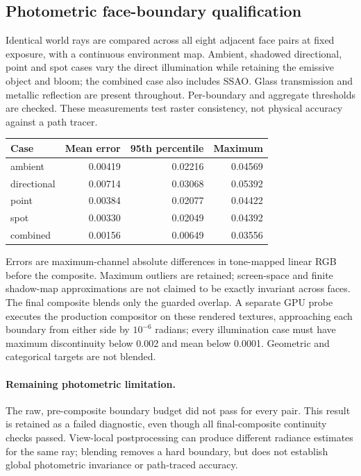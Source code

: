 \subsection{Photometric face-boundary qualification}
Identical world rays are compared across all eight adjacent face pairs at fixed exposure, with a continuous environment map. Ambient, shadowed directional, point and spot cases vary the direct illumination while retaining the emissive object and bloom; the combined case also includes SSAO. Glass transmission and metallic reflection are present throughout. Per-boundary and aggregate thresholds are checked. These measurements test raster consistency, not physical accuracy against a path tracer.
\begin{center}\begin{tabular}{lrrr}\toprule
Case & Mean error & 95th percentile & Maximum \\
\midrule
ambient & 0.00419 & 0.02216 & 0.04569 \\
directional & 0.00714 & 0.03068 & 0.05392 \\
point & 0.00384 & 0.02077 & 0.04422 \\
spot & 0.00330 & 0.02049 & 0.04392 \\
combined & 0.00156 & 0.00649 & 0.03556 \\
\bottomrule\end{tabular}\end{center}
Errors are maximum-channel absolute differences in tone-mapped linear RGB before the composite. Maximum outliers are retained; screen-space and finite shadow-map approximations are not claimed to be exactly invariant across faces. The final composite blends only the guarded overlap. A separate GPU probe executes the production compositor on these rendered textures, approaching each boundary from either side by $10^{-6}$ radians; every illumination case must have maximum discontinuity below 0.002 and mean below 0.0001. Geometric and categorical targets are not blended.
\paragraph{Remaining photometric limitation.} The raw, pre-composite boundary budget did not pass for every pair. This result is retained as a failed diagnostic, even though all final-composite continuity checks passed. View-local postprocessing can produce different radiance estimates for the same ray; blending removes a hard boundary, but does not establish global photometric invariance or path-traced accuracy.
